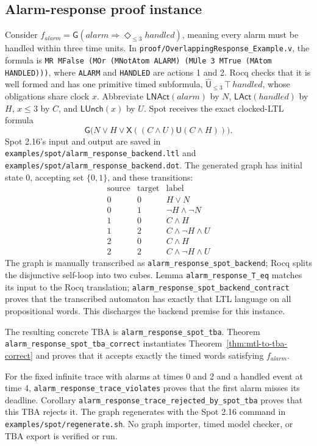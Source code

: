 \documentclass[10pt,journal,compsoc]{IEEEtran}
\newcommand{\Until}{\mathbin{\mathsf{U}}}
\newcommand{\Next}{\mathsf{X}}
\begin{document}
\subsection{Alarm-response proof instance}
\label{sec:alarm-example}
Consider $f_{\mathit{alarm}}=\mathsf{G}(\mathit{alarm}\Rightarrow
\Diamond_{\le 3}\mathit{handled})$, meaning every alarm must be handled within
three time units. In
\texttt{proof/OverlappingResponse\_Example.v}, the formula is
\texttt{MR MFalse (MOr (MNotAtom ALARM) (MUle 3 MTrue (MAtom HANDLED)))},
where \texttt{ALARM} and \texttt{HANDLED} are actions 1 and 2. Rocq checks
that it is well formed and has one primitive timed subformula,
$\widehat{\mathsf{U}}_{\le 3}\,\top\,\mathit{handled}$, whose obligations
share clock $x$. Abbreviate $\mathsf{LNAct}(\mathit{alarm})$ by $N$,
$\mathsf{LAct}(\mathit{handled})$ by $H$, $x\le3$ by $C$, and
$\mathsf{LUnch}(x)$ by $U$. Spot receives the exact clocked-LTL formula
\[
\mathsf{G}\bigl(N\lor H\lor \Next((C\land U)\Until(C\land H))\bigr).
\]
Spot 2.16's input and output are saved in
\texttt{examples/spot/alarm\_response\_backend.ltl} and
\texttt{examples/spot/alarm\_response\_backend.dot}. The generated graph has
initial state 0, accepting set $\{0,1\}$, and these transitions:
\[
\begin{array}{c|c|l}
\text{source}&\text{target}&\text{label}\\ \hline
0&0&H\lor N\\
0&1&\neg H\land\neg N\\
1&0&C\land H\\
1&2&C\land\neg H\land U\\
2&0&C\land H\\
2&2&C\land\neg H\land U
\end{array}
\]
The graph is manually transcribed as
\texttt{alarm\_response\_spot\_backend}; Rocq splits the disjunctive
self-loop into two cubes. Lemma
\texttt{alarm\_response\_T\_eq} matches its input to the Rocq translation;
\texttt{alarm\_response\_spot\_backend\_contract} proves that the transcribed
automaton has exactly that LTL language on all propositional words. This
discharges the backend premise for this instance.

The resulting concrete TBA is
\texttt{alarm\_response\_spot\_tba}. Theorem
\texttt{alarm\_response\_spot\_tba\_correct} instantiates
Theorem~\ref{thm:mtl-to-tba-correct} and proves that it accepts exactly the
timed words satisfying $f_{\mathit{alarm}}$.

For the fixed infinite trace with alarms at times 0 and 2 and a handled event
at time 4, \texttt{alarm\_response\_trace\_violates} proves that the first
alarm misses its deadline. Corollary
\texttt{alarm\_response\_trace\_rejected\_by\_spot\_tba} proves that this
TBA rejects it. The graph regenerates with the Spot 2.16 command in
\texttt{examples/spot/regenerate.sh}. No graph importer, timed model checker,
or TBA export is verified or run.
\end{document}
